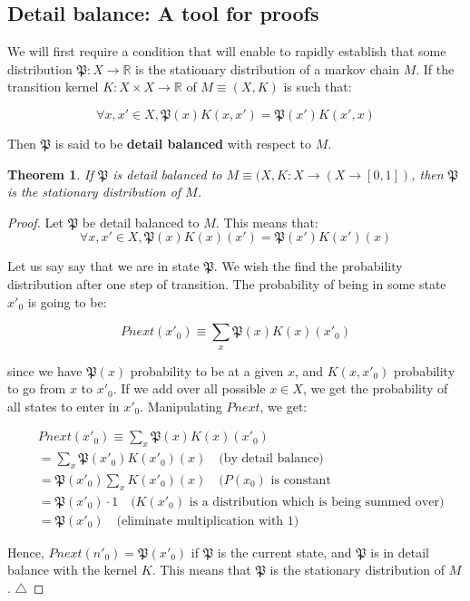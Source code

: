 \documentclass[titlepage]{article}
\newcommand{\R}{\mathbb{R}}
\renewcommand{\P}{\mathfrak{P}}
\newcommand{\qed}{\ensuremath{\triangle}}
\newtheorem{theorem}{Theorem}
\newtheorem{proof}{Proof}[theorem]
\begin{document}
\subsection{Detail balance: A tool for proofs}
We will first require a condition that will enable to rapidly establish that some
distribution $\P: X \rightarrow \R$ is the stationary distribution of a markov chain $M$. If
the transition kernel $K: X \times X \rightarrow \R$ of $M \equiv (X, K)$ is such that:

$$
\forall x, x' \in X, \P(x) K(x, x') = \P(x') K(x', x)
$$

Then $\P$ is said to be \textbf{detail balanced} with respect to $M$.

\begin{theorem}
If $\P$ is detail balanced to $M \equiv (X, K: X \rightarrow (X \rightarrow [0, 1])$,
then $\P$ is the stationary distribution of $M$.
\end{theorem}
\begin{proof}
Let $\P$ be detail balanced to $M$. This means that:
$$
\forall x, x' \in X, \P(x) K(x)(x') = \P(x') K(x')(x)
$$

Let us say say that we are in state $\P$. We wish the find the probability
distribution after one step of transition. The probability of being
in some state $x'_0$ is going to be:

$$
Pnext(x'_0) \equiv \sum_x \P(x) K(x)(x'_0)
$$

since we have $\P(x)$ probability to be at a given $x$, and
$K(x, x'_0)$  probability to go from $x$ to $x'_0$. If we add over all possible
$x \in X$, we get the probability of all states to enter in $x'_0$.
Manipulating $Pnext$, we get:

\begin{align*}
&Pnext(x'_0) \equiv \sum_x \P(x) K(x)(x'_0) \\
&= \sum_x \P(x'_0) K(x'_0)(x) \quad \text{(by detail balance)} \\
&= \P(x'_0) \sum_x K(x'_0)(x) \quad \text{($P(x_0)$ is constant} \\
&= \P(x'_0) \cdot 1 \quad \text{($K(x'_0)$ is a distribution which is being summed over)} \\
&= \P(x'_0) \quad \text{(eliminate multiplication with 1)}
\end{align*}

Hence, $Pnext(n'_0) = \P(x'_0)$ if $\P$ is the current state, and $\P$
is in detail balance with the kernel $K$.
This means that $\P$ is the stationary distribution of $M$.
\qed
\end{proof}
\end{document}
